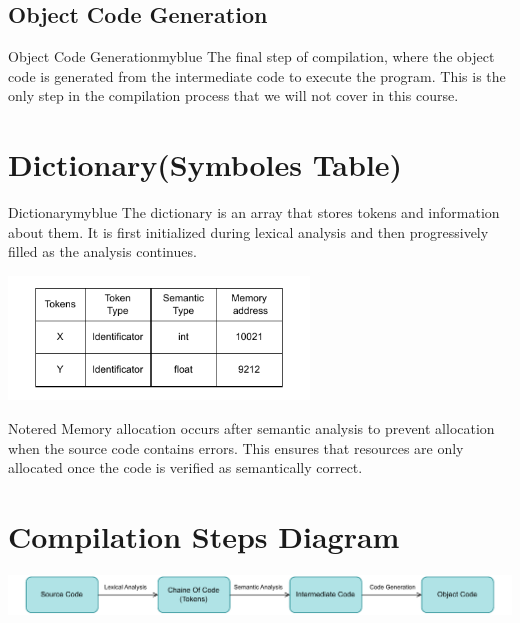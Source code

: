 \vspace{0.35cm}
\subsection{Object Code Generation}

\begin{prettyBox}{Object Code Generation}{myblue}
The final step of compilation, where the object code is generated from the intermediate code to execute the program.
This is the only step in the compilation process that we will not cover in this course.
\end{prettyBox}

\vspace{1cm}

\section{Dictionary(Symboles Table)}

\begin{prettyBox}{Dictionary}{myblue}
The dictionary is an array that stores tokens and information about them.
It is first initialized during lexical analysis and then progressively filled
as the analysis continues.
\end{prettyBox}
\vspace{0.35cm}

\begin{center}
    \includegraphics[width=0.6\textwidth]{Chapters/Examples/Intro/dict.drawio.pdf}
\end{center}


\vspace{0.5cm}


\begin{prettyBox}{Note}{red}
Memory allocation occurs after semantic analysis to prevent allocation when
the source code contains errors. This ensures that resources are only allocated
once the code is verified as semantically correct.
\end{prettyBox}

\vspace{0.5cm}

\section{Compilation Steps Diagram}

\vspace{0.3cm}
\begin{center}
    \includegraphics[height=0.08\textheight]{Chapters/Examples/Intro/sum.drawio.pdf}
\end{center}





